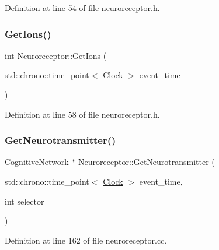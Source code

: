Definition at line 54 of file neuroreceptor.\+h.

\mbox{\label{class_neuroreceptor_a69103180d9b335b9504b4ae3c203d0ea}} 
\subsubsection{\texorpdfstring{Get\+Ions()}{GetIons()}}
{\footnotesize\ttfamily int Neuroreceptor\+::\+Get\+Ions (\begin{DoxyParamCaption}\item[{std\+::chrono\+::time\+\_\+point$<$ \mbox{\hyperlink{universe_8h_a0ef8d951d1ca5ab3cfaf7ab4c7a6fd80}{Clock}} $>$}]{event\+\_\+time }\end{DoxyParamCaption})\hspace{0.3cm}{\ttfamily [inline]}}



Definition at line 58 of file neuroreceptor.\+h.

\mbox{\label{class_neuroreceptor_a526d41738265399c19c67068db450851}} 
\subsubsection{\texorpdfstring{Get\+Neurotransmitter()}{GetNeurotransmitter()}}
{\footnotesize\ttfamily \mbox{\hyperlink{class_cognitive_network}{Cognitive\+Network}} $\ast$ Neuroreceptor\+::\+Get\+Neurotransmitter (\begin{DoxyParamCaption}\item[{std\+::chrono\+::time\+\_\+point$<$ \mbox{\hyperlink{universe_8h_a0ef8d951d1ca5ab3cfaf7ab4c7a6fd80}{Clock}} $>$}]{event\+\_\+time,  }\item[{int}]{selector }\end{DoxyParamCaption})}



Definition at line 162 of file neuroreceptor.\+cc.

\mbox{\label{class_neuroreceptor_a4267220ee11105b7628bf39049ef7cc5}} 
